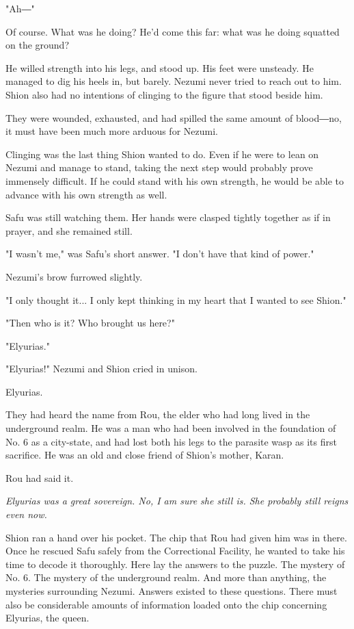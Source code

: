 "Ah―"

Of course. What was he doing? He'd come this far: what was he doing
squatted on the ground?

He willed strength into his legs, and stood up. His feet were unsteady.
He managed to dig his heels in, but barely. Nezumi never tried to reach
out to him. Shion also had no intentions of clinging to the figure that
stood beside him.

They were wounded, exhausted, and had spilled the same amount of
blood―no, it must have been much more arduous for Nezumi.

Clinging was the last thing Shion wanted to do. Even if he were to lean
on Nezumi and manage to stand, taking the next step would probably prove
immensely difficult. If he could stand with his own strength, he would
be able to advance with his own strength as well.

Safu was still watching them. Her hands were clasped tightly together as
if in prayer, and she remained still.

"I wasn't me," was Safu's short answer. "I don't have that kind of
power."

Nezumi's brow furrowed slightly.

"I only thought it... I only kept thinking in my heart that I wanted to
see Shion."

"Then who is it? Who brought us here?"

"Elyurias."

"Elyurias!" Nezumi and Shion cried in unison.

Elyurias.

They had heard the name from Rou, the elder who had long lived in the
underground realm. He was a man who had been involved in the foundation
of No. 6 as a city-state, and had lost both his legs to the parasite
wasp as its first sacrifice. He was an old and close friend of Shion's
mother, Karan.

Rou had said it.

\emph{Elyurias was a great sovereign. No, I am sure she still is. She probably
	still reigns even now.}

Shion ran a hand over his pocket. The chip that Rou had given him was in
there. Once he rescued Safu safely from the Correctional Facility, he
wanted to take his time to decode it thoroughly. Here lay the answers to
the puzzle. The mystery of No. 6. The mystery of the underground realm.
And more than anything, the mysteries surrounding Nezumi. Answers
existed to these questions. There must also be considerable amounts of
information loaded onto the chip concerning Elyurias, the queen.


